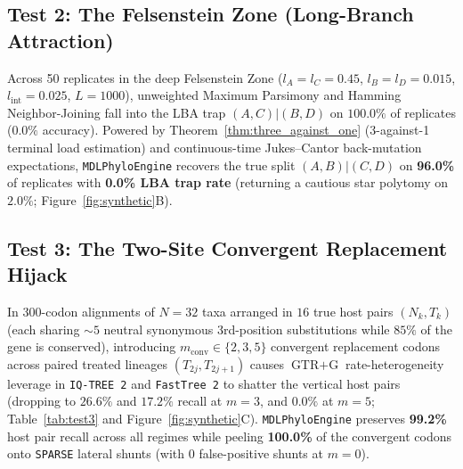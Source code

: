 \documentclass[11pt,a4paper]{article}
\begin{document}
\begin{table}[H]
\centering
\caption{Test 1 --- True Polytomy \& Star-Radiation Calibration ($N=32, L=1000$, 13 True Splits, 16 Zero-Length Slots, 15 Replicates).}
\label{tab:test1}
\end{table}

\subsection{Test 2: The Felsenstein Zone (Long-Branch Attraction)}

Across 50 replicates in the deep Felsenstein Zone ($l_A = l_C = 0.45$, $l_B = l_D = 0.015$, $l_{\text{int}} = 0.025$, $L = 1000$), unweighted Maximum Parsimony and Hamming Neighbor-Joining fall into the LBA trap $(A,C)|(B,D)$ on $100.0\%$ of replicates ($0.0\%$ accuracy). Powered by Theorem~\ref{thm:three_against_one} (3-against-1 terminal load estimation) and continuous-time Jukes--Cantor back-mutation expectations, \texttt{MDLPhyloEngine} recovers the true split $(A,B)|(C,D)$ on \textbf{96.0\%} of replicates with \textbf{0.0\% LBA trap rate} (returning a cautious star polytomy on $2.0\%$; Figure~\ref{fig:synthetic}B).

\subsection{Test 3: The Two-Site Convergent Replacement Hijack}

In 300-codon alignments of $N=32$ taxa arranged in $16$ true host pairs $(N_k, T_k)$ (each sharing $\sim 5$ neutral synonymous 3rd-position substitutions while $85\%$ of the gene is conserved), introducing $m_{\text{conv}} \in \{2, 3, 5\}$ convergent replacement codons across paired treated lineages $(T_{2j}, T_{2j+1})$ causes $\text{GTR}+\text{G}$ rate-heterogeneity leverage in \texttt{IQ-TREE 2} and \texttt{FastTree 2} to shatter the vertical host pairs (dropping to $26.6\%$ and $17.2\%$ recall at $m=3$, and $0.0\%$ at $m=5$; Table~\ref{tab:test3} and Figure~\ref{fig:synthetic}C). \texttt{MDLPhyloEngine} preserves \textbf{99.2\%} host pair recall across all regimes while peeling \textbf{100.0\%} of the convergent codons onto \texttt{SPARSE} lateral shunts (with $0$ false-positive shunts at $m=0$).
\end{document}
